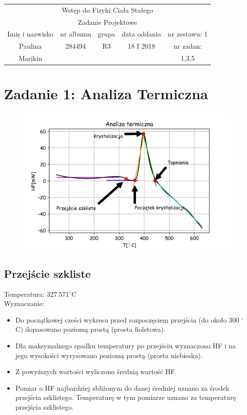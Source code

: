 \documentclass[a4paper,10pt]{article}
\def\arraystretch{1.2}
\begin{document}
\begin{table}
  \centering
  \def\arraystretch{1.5}
    \begin{tabular}{|c|c|c|c|c|} \hline
    \multicolumn{5}{|c|}{Wstęp do Fizyki Ciała Stałego}\\
		\multicolumn{5}{|c|}{Zadanie Projektowe} \\\hline
    Imię i nazwisko	&	nr albumu	&	grupa	&	data oddania	&	nr zestawu: 1	\\\hline
				Paulina			&		284494	&		R3	&		18 I 2018		&	nr zadan:  \\
				Marikin			&						&				&								&	1,3,5 \\\hline
  \end{tabular}
\end{table}


\section{Zadanie 1: Analiza Termiczna}

\begin{figure}[H]
	\centering
		\includegraphics[width=\textwidth]{../Analiza_termiczna.png}
\end{figure}

\subsection{Przejście szkliste}
Temperatura: 327.571$^\circ$C \\
Wyznaczanie:
\begin{itemize}
	\item Do początkowej cześci wykresu przed rozpoczęciem przejścia (do około 300 $^\circ$C) dopasowano poziomą prostą (prosta fioletowa).
	\item Dla maksymalnego spadku temperatury po przejściu wyznaczono HF i na jego wysokości wyrysowano poziomą prostą (prosta niebieska).
	\item Z powyższych wartości wyliczono średnią wartość HF.
	\item Pomiar o HF najbardziej zbliżonym do danej średniej uznano za środek przejścia szklistego. Temperaturę w tym pomiarze uznano za temperaturę przejścia szklistego.
\end{itemize}
\end{document}
